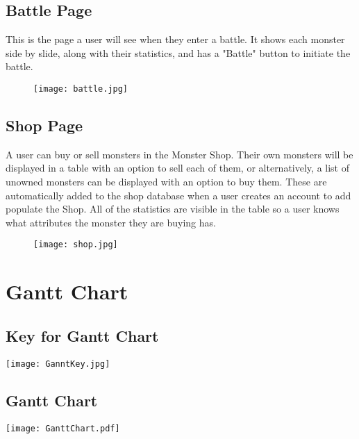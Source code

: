 \documentclass[titlepage]{article}
\begin{document}
\subsection{Battle Page}
This is the page a user will see when they enter a battle. It shows each monster side by slide, along with their statistics, and has a "Battle" button to initiate the battle.
\begin{figure}[h]
\begin{sideways}
\texttt{[image: battle.jpg]}
\end{sideways}
\end{figure}
\newpage
\subsection{Shop Page}
A user can buy or sell monsters in the Monster Shop. Their own monsters will be displayed in a table with an option to sell each of them, or alternatively, a list of unowned monsters can be displayed with an option to buy them. These are automatically added to the shop database when a user creates an account to add populate the Shop. All of the statistics are visible in the table so a user knows what attributes the monster they are buying has.
\begin{figure}[h]
\begin{sideways}
\texttt{[image: shop.jpg]}
\end{sideways}
\end{figure}
\newpage
\section{Gantt Chart}
\subsection{Key for Gantt Chart}
\begin{figure*}[h]
\texttt{[image: GanntKey.jpg]} 
\label{fig:GanntKey}
\end{figure*}
\newpage
\subsection{Gantt Chart}
\begin{figure*}[h]
\begin{sideways}
\texttt{[image: GanttChart.pdf]} 
\label{fig:GanttChart}
\end{sideways}
\end{figure*}
\newpage
\end{document}
